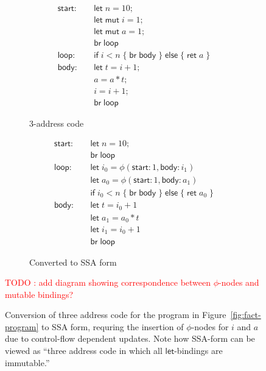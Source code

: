 \documentclass[acmsmall,screen,review]{acmart}
\newcounter{todos}
\newcommand{\todo}[1]{\stepcounter{todos} \textcolor{red}{TODO \arabic{todos}: #1}}
\newcommand{\ms}[1]{\ensuremath{\mathsf{#1}}}
\begin{document}
\begin{figure}
  \begin{subfigure}[t]{.5\textwidth}
    \begin{align*}
      \ms{start}:\quad  & \ms{let}\;n = 10; \\
                        & \ms{let\;mut}\;i = 1; \\
                        & \ms{let\;mut}\;a = 1; \\
                        & \ms{br}\;\ms{loop} \\
      \ms{loop}: \quad  & \ms{if}\;i < n\;
                          \{\;\ms{br}\;\ms{body}\;\}\;
                          \ms{else}\;\{\;\ms{ret}\;a\;\} \\
      \ms{body}: \quad  & \ms{let}\;t = i + 1; \\
                        & a = a * t; \\
                        & i = i + 1; \\
                        & \ms{br}\;\ms{loop}
    \end{align*}
    \caption{3-address code}
  \end{subfigure}%
  \begin{subfigure}[t]{.5\textwidth}
    \begin{align*}
      \ms{start}:\quad & \ms{let}\;n = 10; \\
      & \ms{br}\;\ms{loop} \\
      \ms{loop}: \quad  & \ms{let}\;i_0 = \phi(\ms{start}: 1, \ms{body}: i_1) \\
                        & \ms{let}\;a_0 = \phi(\ms{start}: 1, \ms{body}: a_1) \\
                        & \ms{if}\;i_0 < n\;
                          \{\;\ms{br}\;\ms{body}\;\}\;
                          \ms{else}\;\{\;\ms{ret}\;a_0\;\} \\
      \ms{body}: \quad  & \ms{let}\;t = i_0 + 1 \\
                        & \ms{let}\;a_1 = a_0 * t \\
                        & \ms{let}\;i_1 = i_0 + 1 \\
                        & \ms{br}\;\ms{loop}
    \end{align*}
    \caption{Converted to SSA form}
    \label{fig:fact-ssa}
  \end{subfigure}
  \todo{add diagram showing correspondence between $\phi$-nodes and mutable bindings?}
  \caption{
    Conversion of three address code for the program in Figure~\ref{fig:fact-program} to SSA 
    form, requring the insertion of $\phi$-nodes for $i$ and $a$ due to control-flow dependent
    updates. Note how SSA-form can be viewed as ``three address code in which all 
    \ms{let}-bindings are immutable.''
  }
  \Description{}
\end{figure}
\end{document}
